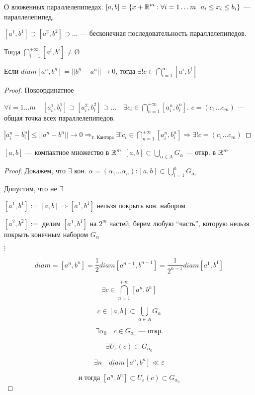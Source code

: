 \begin{lemma}
    О вложенных параллелепипедах.
    $[a, b] = \{x+\operatorname*{\mathbb{R}}^m: \forall i=1\ldots m \ \ a_i\leq x_i\leq b_i\}$ --- параллелепипед.

    $[a^1, b^1]\supset[a^2, b^2]\supset\ldots$ --- бесконечная последовательность параллелепипедов.

    Тогда $\bigcap\limits_{i=1}^{+\infty}[a^i, b^i]\not=$\O

    Если $diam[a^n, b^n]=||b^n-a^n||\to 0$, тогда $\exists! c\in\bigcap\limits_{i=1}^\infty[a^i, b^i]$
\end{lemma}
\begin{proof}
    Покоординатное

    $\forall i=1\ldots m \quad [a^1_i, b^1_i]\supset[a^2_i, b^2_i]\supset\ldots \quad \exists c_i\in \bigcap\limits_{n=1}^{+\infty}[a_i^n, b_i^n]$. $c=(c_1\ldots c_m)$ --- общая точка всех параллелепипедов.

    $|a_i^n-b_i^n|\leq ||a^n-b^n||\to 0 \Rightarrow_{\text{т. Кантора}}\exists! c_i\in\bigcap\limits_{n=1}^{+\infty}[a_i^n, b_i^n] \Rightarrow \exists! c=(c_1\ldots c_m)$
\end{proof}
\begin{lemma}
    $[a,b]$ --- компактное множество в $\operatorname*{\mathbb{R}}^m$
    $[a, b]\subset\bigcup\limits_{\alpha\in A} G_\alpha$ --- откр. в $\operatorname*{\mathbb{R}}^m$
\end{lemma}

\begin{proof}
    Докажем, что $\exists$ кон. $\alpha=(\alpha_1\ldots\alpha_n): [a,b]\subset \bigcup\limits_{i=1}^n G_{\alpha_i}$

    Допустим, что не $\exists$

    $[a^1, b^1]:=[a,b] \Rightarrow [a^1, b^1]$ нельзя покрыть кон. набором

    $[a^2, b^2]:=$ делим $[a^1, b^1]$ на $2^m$ частей, берем любую ``часть'', которую нельзя покрыть конечным набором $G_\alpha$

    $\vdots$

    $$diam=[a^n, b^n]=\frac{1}{2}diam[a^{n-1}, b^{n-1}]=\frac{1}{2^{n-1}}diam[a^1,b^1]$$

    $$\exists c\in \bigcap\limits_{n=1}^{+\infty}[a^n, b^n]$$

    $$c\in [a, b] \subset \bigcup\limits_{\alpha\in A} G_\alpha$$

    $$\exists \alpha_0 \quad c\in G_{\alpha_0} \text{ --- откр.}$$
    
    $$\exists U_\varepsilon(c)\subset G_{\alpha_0}$$

    $$\exists n \quad diam[a^n, b^n] \ll \varepsilon$$

    $$\text{и тогда } [a^n, b^n]\subset U_\varepsilon(c)\subset G_{\alpha_0}$$
    
\end{proof}

